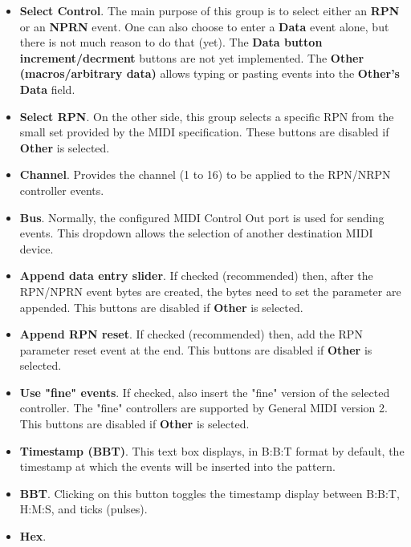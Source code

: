    \begin{itemize}
      \item \textbf{Select Control}.
         The main purpose of this group is to select either an
         \textbf{RPN} or an
         \textbf{NPRN} event.
         One can also choose to enter a \textbf{Data} event alone, but
         there is not much reason to do that (yet).
         The \textbf{Data button increment/decrment} buttons
         are not yet implemented.
         The \textbf{Other (macros/arbitrary data)} allows typing or
         pasting events into the \textbf{Other's Data} field.
      \item \textbf{Select RPN}.
         On the other side, this group selects a specific RPN from
         the small set provided by the MIDI specification.
         These buttons are disabled if \textbf{Other} is
         selected.
      \item \textbf{Channel}.
         Provides the channel (1 to 16) to be applied to the RPN/NRPN
         controller events.
      \item \textbf{Bus}.
         Normally, the configured MIDI Control Out port is used for
         sending events. This dropdown allows the selection of another
         destination MIDI device.
      \item \textbf{Append data entry slider}.
         If checked (recommended) then, after the RPN/NPRN event
         bytes are created, the bytes need to set the parameter
         are appended.
         This buttons are disabled if \textbf{Other} is
         selected.
      \item \textbf{Append RPN reset}.
         If checked (recommended) then, add the RPN parameter reset
         event at the end.
         This buttons are disabled if \textbf{Other} is
         selected.
      \item \textbf{Use "fine" events}.
         If checked, also insert the "fine" version of the selected controller.
         The "fine" controllers are supported by General MIDI version 2.
         This buttons are disabled if \textbf{Other} is
         selected.
      \item \textbf{Timestamp (BBT)}.
         This text box displays, in B:B:T format by default,
         the timestamp at which the events will be inserted into the
         pattern.
      \item \textbf{BBT}.
         Clicking on this button toggles the timestamp display between
         B:B:T, H:M:S, and ticks (pulses).
      \item \textbf{Hex}.

\end{itemize}
